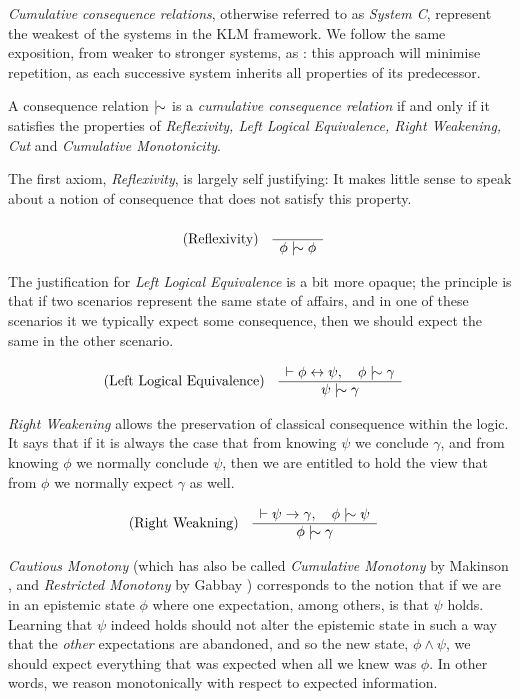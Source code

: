 \textit{Cumulative consequence relations}, otherwise referred to as \textit{System C}, represent the weakest of the
systems in the KLM framework. We follow the same exposition, from weaker to stronger systems, as \cite{kraus1990nonmonotonic}:
this approach will minimise repetition, as each successive system inherits all properties of its predecessor.

\begin{definition}
	\label{definition:cumulative-consequence-relation} 

	A consequence relation $\twiddle$ is a \emph{cumulative consequence relation} if and only if it satisfies the properties
	of \emph{Reflexivity, Left Logical Equivalence, Right Weakening, Cut} and \emph{Cumulative Monotonicity}.
\end{definition}

The first axiom, \textit{Reflexivity}, is largely self justifying: It makes little sense to speak about a notion of
consequence that does not satisfy this property.

\begin{align}
	\label{postulate:ref}\inferLeft{Reflexivity}{}{\phi \twiddle \phi}
\end{align}

The justification for \textit{Left Logical Equivalence} is a bit more opaque; the principle is that if two scenarios represent
the same state of affairs, and in one of these scenarios it we typically expect some consequence, then we should expect the
same in the other scenario.

\begin{align}
	\label{postulate:lle}\inferLeft{Left Logical Equivalence}{\vdash \phi \leftrightarrow \psi, \quad \phi \twiddle \gamma}{\psi \twiddle \gamma}
\end{align}

\textit{Right Weakening} allows the preservation of classical consequence within the logic. It says that if it is always
the case that from knowing $\psi$ we conclude $\gamma$, and from knowing $\phi$ we normally conclude $\psi$, then we are
entitled to hold the view that from $\phi$ we normally expect $\gamma$ as well.

\begin{align}
	\label{postulate:rw}\inferLeft{Right Weakning}{\vdash \psi \rightarrow \gamma, \quad \phi \twiddle \psi}{\phi \twiddle \gamma}
\end{align}

\textit{Cautious Monotony} (which has also be called \textit{Cumulative Monotony} by Makinson \cite{makinson2003bridges},
and \textit{Restricted Monotony} by Gabbay \cite{gabbay1985theoreticalFoundations}) corresponds to the notion that if we
are in an epistemic state $\phi$ where one expectation, among others, is that $\psi$ holds. Learning that $\psi$ indeed
holds should not alter the epistemic state in such a way that the \textit{other} expectations are abandoned, and so the
new state, $\phi \land \psi$, we should expect everything that was expected when all we knew was $\phi$. In other words,
we reason monotonically with respect to expected information.

